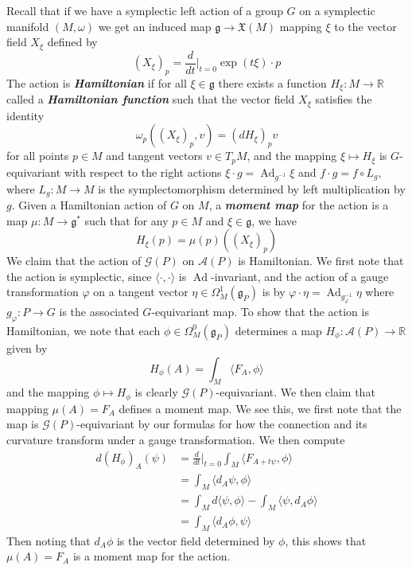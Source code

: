 \documentclass[psamsfonts, 12pt]{amsart}
\theoremstyle{definition}
\theoremstyle{remark}
\newcommand{\R}{\mathbb{R}}
\newcommand{\ib}[1]{\textbf{\textit{#1}}}
\newcommand{\g}{\mathfrak{g}}
\newcommand{\inv}{^{-1}}
\DeclareMathOperator{\Ad}{Ad}
\begin{document}
Recall that if we have a symplectic left action of a group $G$ on a symplectic manifold
$(M,\omega)$ we get an induced map $\g \to \mathfrak{X}(M)$ mapping $\xi$ to the vector
field $X_\xi$ defined by
\[
(X_\xi)_p = \frac{d}{dt}\bigg\vert_{t=0} \exp(t\xi)\cdot p
\]
The action is \ib{Hamiltonian} if for all $\xi \in \g$ there exists a function
$H_\xi : M \to \R$ called a \ib{Hamiltonian function} such that the vector field
$X_\xi$ satisfies the identity
\[
\omega_p((X_\xi)_p, v) = (dH_\xi)_p v
\]
for all points $p \in M$ and tangent vectors $v \in T_pM$, and the mapping
$\xi \mapsto H_\xi$ is $G$-equivariant with respect to the right actions
$\xi\cdot g= \Ad_{g\inv}\xi$ and $f \cdot g = f \circ L_g$, where $L_g : M \to M$
is the symplectomorphism determined by left multiplication by $g$. Given a
Hamiltonian action of $G$ on $M$, a \ib{moment map} for the action is a map
$\mu : M \to \g^*$ such that for any $p \in M$ and $\xi \in \g$, we have
\[
H_\xi(p) = \mu(p)((X_\xi)_p)
\]
We claim that the action of $\mathscr{G}(P)$ on $\mathscr{A}(P)$ is Hamiltonian.
We first note that the action is symplectic, since
$\langle\cdot,\cdot\rangle$ is $\Ad$-invariant, and the action of
a gauge transformation $\varphi$ on a tangent vector $\eta \in \Omega^1_M(\g_P)$
is by $\varphi\cdot\eta = \Ad_{g_\varphi\inv}\eta$ where
$g_\varphi : P \to G$ is the associated $G$-equivariant map. To show that the
action is Hamiltonian, we note that each $\phi \in \Omega^0_M(\g_P)$ determines
a map $H_\phi : \mathscr{A}(P) \to \R$ given by
\[
H_\phi(A) = \int_M \langle F_A,\phi\rangle
\]
and the mapping $\phi \mapsto H_\phi$ is clearly $\mathscr{G}(P)$-equivariant.
We then claim that mapping $\mu(A) = F_A$ defines a moment map. We see this, we first
note that the map is $\mathscr{G}(P)$-equivariant by our formulas for how the connection
and its curvature transform under a gauge transformation. We then compute
\begin{align*}
d(H_\phi)_A(\psi) &= \frac{d}{dt}\bigg\vert_{t=0}\int_M\langle F_{A+t\psi},\phi\rangle \\
&= \int_M \langle d_A\psi,\phi\rangle \\
&= \int_M d\langle\psi,\phi\rangle - \int_M \langle \psi,d_A\phi\rangle \\
&= \int_M\langle d_A\phi,\psi\rangle
\end{align*}
%
Then noting that $d_A\phi$ is the vector field determined by $\phi$, this
shows that $\mu(A) = F_A$ is a moment map for the action.
%
\end{document}
